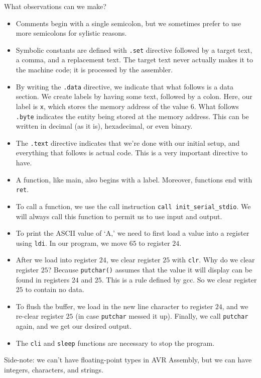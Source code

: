What observations can we make? 
\begin{itemize}
    \item Comments begin with a single semicolon, but we sometimes prefer to use more semicolons for sylistic reasons.
    \item Symbolic constants are defined with \verb!.set! directive followed by a target text, a comma, and a replacement text. The target text never actually makes it to the machine code; it is processed by the assembler.
    \item By writing the \verb!.data! directive, we indicate that what follows is a data section. We create labels by having some text, followed by a colon. Here, our label is \verb!x!, which stores the memory address of the value $6$. What follows \verb!.byte! indicates the entity being stored at the memory address. This can be written in decimal (as it is), hexadecimal, or even binary. 
    \item The \verb!.text! directive indicates that we're done with our initial setup, and everything that follows is actual code. This is a very important directive to have.
    \item A function, like main, also begins with a label. Moreover, functions end with \verb!ret!. 
    \item To call a function, we use the call instruction \verb!call init_serial_stdio!. We will always call this function to permit us to use input and output.
    \item To print the ASCII value of `A,' we need to first load a value into a register using \verb!ldi!. In our program, we move $65$ to register $24$. 
    \item After we load into register $24$, we clear register $25$ with \verb!clr!. Why do we clear register $25$? Because \verb!putchar()! assumes that the value it will display can be found in registers $24$ and $25$. This is a rule defined by gcc. So we clear register $25$ to contain no data.
    \item To flush the buffer, we load in the new line character to register $24$, and we re-clear register $25$ (in case \verb!putchar! messed it up). Finally, we call \verb!putchar! again, and we get our desired output.
    \item The \verb!cli! and \verb!sleep! functions are necessary to stop the program. 
\end{itemize}










Side-note: we can't have floating-point types in AVR Assembly, but we can have integers, characters, and strings. 